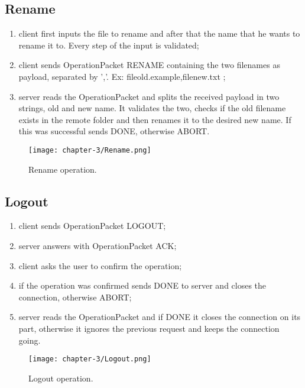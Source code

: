 \subsection{Rename}
\begin{enumerate}
	\item client first inputs the file to rename and after that the name that he wants to rename it to. Every step of the input is validated;
	\item client sends OperationPacket RENAME containing the two filenames as payload, separated by ','. Ex: fileold.example,filenew.txt ;
	\item server reads the OperationPacket and splits the received payload in two strings, old and new name. It validates the two, checks if the old filename exists in the remote folder and then renames it to the desired new name. If this was successful sends DONE, otherwise ABORT.
\end{enumerate}

\begin{figure}[!h] 
    \centering 
    \texttt{[image: chapter-3/Rename.png]} 
    \caption{Rename operation.}
    \label{fig:rename_operation}
\end{figure}
\newpage{}
\subsection{Logout}
\begin{enumerate}
	\item client sends OperationPacket LOGOUT;
	\item server answers with OperationPacket ACK;
	\item client asks the user to confirm the operation;
	\item if the operation was confirmed sends DONE to server and closes the connection, otherwise ABORT;
	\item server reads the OperationPacket and if DONE it closes the connection on its part, otherwise it ignores the previous request and keeps the connection going.
\end{enumerate}


\begin{figure}[!h] 
    \centering 
    \texttt{[image: chapter-3/Logout.png]} 
    \caption{Logout operation.}
    \label{fig:logout_operation}
\end{figure}
